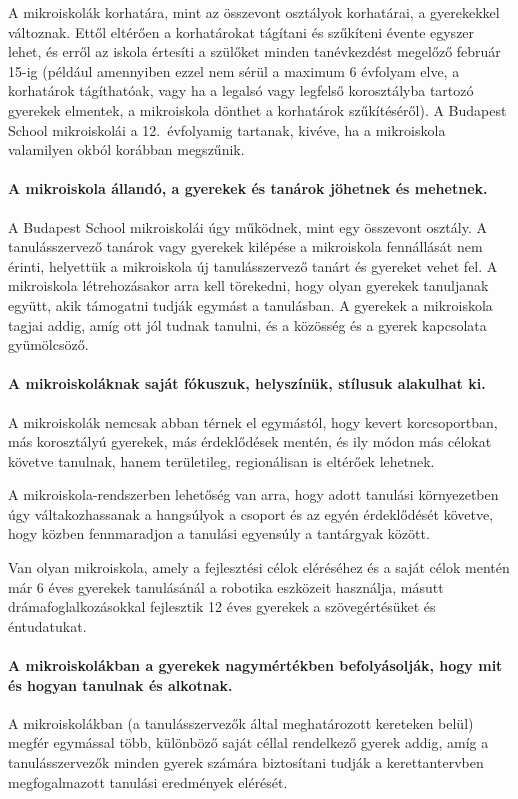 A mikroiskolák korhatára, mint az összevont osztályok korhatárai, a gyerekekkel változnak. Ettől eltérően a korhatárokat tágítani és szűkíteni évente egyszer lehet, és erről az iskola értesíti a szülőket minden tanévkezdést megelőző február 15-ig (például amennyiben ezzel nem sérül a maximum 6 évfolyam elve, a korhatárok tágíthatóak, vagy ha a legalsó vagy legfelső korosztályba tartozó gyerekek elmentek, a mikroiskola dönthet a korhatárok szűkítéséről). A Budapest School mikroiskolái a 12.~évfolyamig tartanak, kivéve, ha a mikroiskola valamilyen okból korábban megszűnik.

\paragraph{A mikroiskola állandó, a gyerekek és tanárok jöhetnek és mehetnek.}
A Budapest School mikroiskolái úgy működnek, mint egy összevont osztály. A tanulásszervező tanárok vagy gyerekek kilépése a mikroiskola fennállását nem érinti, helyettük a mikroiskola új tanulásszervező tanárt és gyereket vehet fel.  A mikroiskola létrehozásakor arra kell törekedni, hogy olyan gyerekek tanuljanak együtt, akik támogatni tudják egymást a tanulásban. A gyerekek a mikroiskola tagjai addig, amíg ott jól tudnak tanulni, és a közösség és a gyerek kapcsolata gyümölcsöző.

\paragraph{A mikroiskoláknak saját fókuszuk, helyszínük, stílusuk alakulhat ki.}
A mikroiskolák nemcsak abban térnek el egymástól, hogy kevert korcsoportban, más korosztályú gyerekek, más érdeklődések mentén, és ily módon más célokat követve tanulnak, hanem területileg, regionálisan is eltérőek lehetnek.

A mikroiskola-rendszerben lehetőség van arra, hogy adott tanulási környezetben úgy váltakozhassanak a hangsúlyok a csoport és az egyén érdeklődését követve, hogy közben fennmaradjon a tanulási egyensúly a tantárgyak között.

Van olyan mikroiskola, amely a fejlesztési célok eléréséhez és a saját célok mentén már 6 éves gyerekek tanulásánál a robotika eszközeit használja, másutt drámafoglalkozásokkal fejlesztik 12 éves gyerekek a szövegértésüket és éntudatukat.

\paragraph{A mikroiskolákban a gyerekek nagymértékben befolyásolják, hogy mit és hogyan tanulnak és alkotnak.}
A mikroiskolákban (a tanulásszervezők által meghatározott kereteken belül) megfér egymással több, különböző saját céllal rendelkező gyerek addig, amíg a tanulásszervezők minden gyerek számára biztosítani tudják a kerettantervben megfogalmazott tanulási eredmények elérését.

